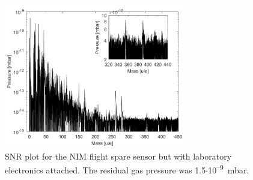 		\begin{figure}[h]
			\centering
			\includegraphics[width = 0.7\textwidth]{Experiments/FSLabSNRRestGasPressCal.png}
			\caption{SNR plot for the NIM flight spare sensor but with laboratory electronics attached. The residual gas pressure was 1.5$\cdot$10\textsuperscript{--9}~mbar.}
			\label{fig:ExpFSFlightSenSNR}
		\end{figure}
	
